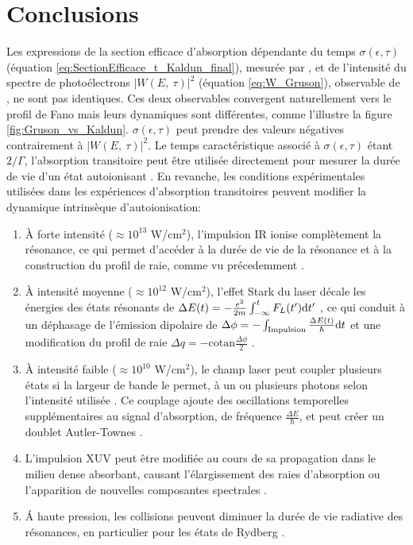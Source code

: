 \section{Conclusions}
Les expressions de la section efficace d'absorption dépendante du temps $\sigma(\epsilon,\tau)$ (équation \ref{eq:SectionEfficace_t_Kaldun_final}), mesurée par , et de l'intensité du spectre de photoélectrons $|W(E, \:  \tau)|^2$ (équation \ref{eq:W_Gruson}), observable de , ne sont pas identiques. Ces deux observables convergent naturellement vers le profil de Fano mais leurs dynamiques sont différentes, comme l'illustre la figure \ref{fig:Gruson_vs_Kaldun}. $\sigma(\epsilon,\tau)$ peut prendre des valeurs négatives contrairement à $|W(E, \:  \tau)|^2$. Le temps caractéristique associé à $\sigma(\epsilon,\tau)$ étant $2/\Gamma$, l'absorption transitoire peut être utilisée directement pour mesurer la durée de vie d'un état autoionisant . En revanche, les conditions expérimentales utilisées dans les expériences d'absorption transitoires peuvent modifier la dynamique intrinsèque d'autoionisation:
\begin{enumerate}[label=\textbullet]
\item \`{A} forte intensité ($\approx 10^{13}$ W/cm$^2$), l'impulsion IR ionise complètement la résonance, ce qui permet d'accéder à la durée de vie de la résonance et à la construction du profil de raie, comme vu précedemment .
\item \`{A} intensité moyenne ($\approx 10^{12}$ W/cm$^2$), l'effet Stark du laser décale les énergies des états résonants de $\Delta E (t) = -\frac{e^2}{2m} \int_{- \infty}^{t} F_L(t') \mathrm{d} t'$ , ce qui conduit à un déphasage de l'émission dipolaire de $\Delta \phi = - \int_{\text{Impulsion}} \frac{\Delta E (t)}{\hbar} \mathrm{d} t$ et une modification du profil de raie $\Delta q = - \text{cotan} \frac{ \Delta \phi}{2}$ .
\item \`{A} intensité faible ($\approx 10 ^{10}$ W/cm$^2$), le champ laser peut coupler plusieurs états si la largeur de bande le permet, à un ou plusieurs photons selon l'intensité utilisée . Ce couplage ajoute des oscillations temporelles supplémentaires au signal d'absorption, de fréquence $\frac{\Delta E}{\hbar}$, et peut créer un doublet Autler-Townes .
\item L'impulsion XUV peut être modifiée au cours de sa propagation dans le milieu dense absorbant, causant l'élargissement des raies d'absorption ou l'apparition de nouvelles composantes spectrales  .
\item \'{A} haute pression, les collisions peuvent diminuer la durée de vie radiative des résonances, en particulier pour les états de Rydberg .
\end{enumerate}

